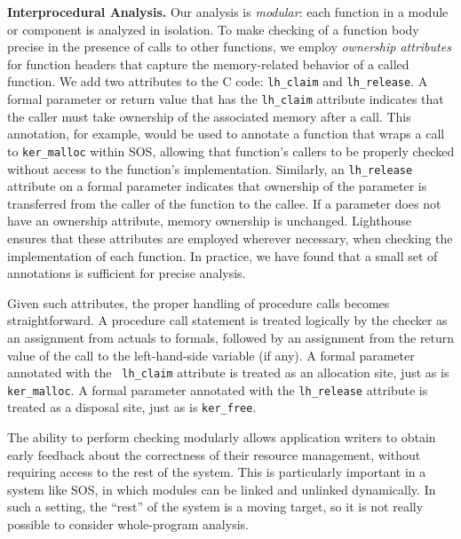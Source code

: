 \smallskip\noindent
{\bf Interprocedural Analysis.}
Our analysis is {\em modular}:  each function in a module or component
is analyzed in isolation.  To make checking of a function body precise
in the presence of calls to other functions, we employ {\em ownership
attributes} for function headers that capture the memory-related
behavior of a called function.  We add two attributes to the C code:
{\tt lh\_claim} and {\tt lh\_release}.  A formal parameter or return
value that has the {\tt lh\_claim} attribute indicates that the caller
must take ownership of the associated memory after a call.  This
annotation, for example, would be used to annotate a function that
wraps a call to {\tt ker\_malloc} within SOS, allowing that function's
callers to be properly checked without access to the function's
implementation.  Similarly, an {\tt lh\_release} attribute on a formal
parameter indicates that ownership of the parameter is transferred
from the caller of the function to the callee.  If a parameter does
not have an ownership attribute, memory ownership is unchanged.  Lighthouse
ensures that these attributes are employed wherever necessary,
when checking the implementation of each function.  In practice, we
have found that a small set of annotations is sufficient for precise
analysis.


Given such attributes, the proper handling of procedure calls becomes
straightforward.  A procedure call statement is treated logically by
the checker as an assignment from actuals to formals, followed by an
assignment from the return value of the call to the left-hand-side
variable (if any).  A formal parameter annotated with the {\tt
lh\_claim} attribute is treated as an allocation site, just as is {\tt
ker\_malloc}.  A formal parameter annotated with the {\tt lh\_release}
attribute is treated as a disposal site, just as is {\tt ker\_free}.

The ability to perform checking modularly allows application writers
to obtain early feedback about the correctness of their resource
management, without requiring access to the rest of the system.  This
is particularly important in a system like SOS, in which modules can
be linked and unlinked dynamically.  In such a setting, the ``rest''
of the system is a moving target, so it is not really possible to
consider whole-program analysis.



